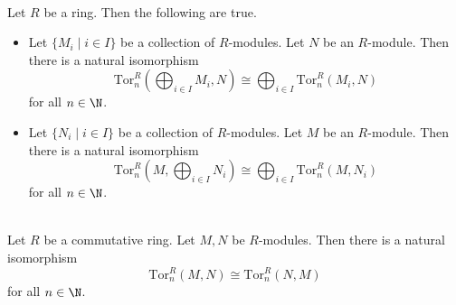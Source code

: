 \documentclass[a4paper]{article}
\begin{document}
\begin{prp}{}{}\\
Let $R$ be a ring. Then the following are true. 
\begin{itemize}
\item Let $\{M_i\;|\;i\in I\}$ be a collection of $R$-modules. Let $N$ be an $R$-module. Then there is a natural isomorphism $$\text{Tor}_n^R\left(\bigoplus_{i\in I}M_i,N\right)\cong\bigoplus_{i\in I}\text{Tor}_n^R(M_i,N)$$ for all $n\in\N$. 
\item Let $\{N_i\;|\;i\in I\}$ be a collection of $R$-modules. Let $M$ be an $R$-module. Then there is a natural isomorphism $$\text{Tor}_n^R\left(M,\bigoplus_{i\in I}N_i\right)\cong\bigoplus_{i\in I}\text{Tor}_n^R(M,N_i)$$ for all $n\in\N$. 
\end{itemize}
\end{prp}

\begin{prp}{}{}\\
Let $R$ be a commutative ring. Let $M,N$ be $R$-modules. Then there is a natural isomorphism $$\text{Tor}_n^R(M,N)\cong\text{Tor}_n^R(N,M)$$ for all $n\in\N$. 
\end{prp}
\end{document}
